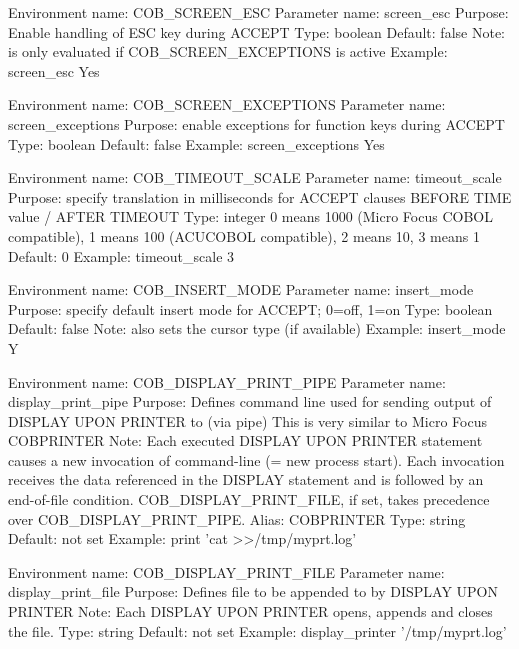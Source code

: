 Environment name:  COB_SCREEN_ESC
  Parameter name:  screen_esc
         Purpose:  Enable handling of ESC key during ACCEPT
            Type:  boolean
         Default:  false
            Note:  is only evaluated if COB_SCREEN_EXCEPTIONS is active
         Example:  screen_esc Yes

Environment name:  COB_SCREEN_EXCEPTIONS
  Parameter name:  screen_exceptions
         Purpose:  enable exceptions for function keys during ACCEPT
            Type:  boolean
         Default:  false
         Example:  screen_exceptions Yes

Environment name:  COB_TIMEOUT_SCALE
  Parameter name:  timeout_scale
         Purpose:  specify translation in milliseconds for ACCEPT clauses
                   BEFORE TIME value / AFTER TIMEOUT
            Type:  integer
                   0 means 1000 (Micro Focus COBOL compatible), 1 means 100
                   (ACUCOBOL compatible), 2 means 10, 3 means 1
         Default:  0
         Example:  timeout_scale 3

Environment name:  COB_INSERT_MODE
  Parameter name:  insert_mode
         Purpose:  specify default insert mode for ACCEPT; 0=off, 1=on
            Type:  boolean
         Default:  false
            Note:  also sets the cursor type (if available)
         Example:  insert_mode Y

Environment name:  COB_DISPLAY_PRINT_PIPE
  Parameter name:  display_print_pipe
         Purpose:  Defines command line used for sending output of
                   DISPLAY UPON PRINTER to (via pipe)
                   This is very similar to Micro Focus COBPRINTER
            Note:  Each executed DISPLAY UPON PRINTER statement causes a
                   new invocation of command-line (= new process start).
                   Each invocation receives the data referenced in
                   the DISPLAY statement and is followed by an
                   end-of-file condition.
                   COB_DISPLAY_PRINT_FILE, if set, takes precedence
                   over COB_DISPLAY_PRINT_PIPE.
           Alias:  COBPRINTER
            Type:  string
         Default:  not set
         Example:  print 'cat >>/tmp/myprt.log'

Environment name:  COB_DISPLAY_PRINT_FILE
  Parameter name:  display_print_file
         Purpose:  Defines file to be appended to by DISPLAY UPON PRINTER
            Note:  Each DISPLAY UPON PRINTER opens, appends and closes the file.
            Type:  string
         Default:  not set
         Example:  display_printer '/tmp/myprt.log'

